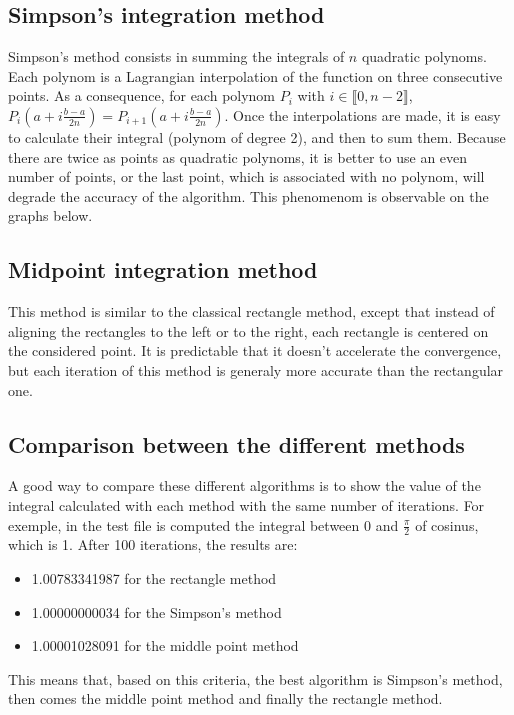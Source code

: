 \documentclass{article}
\begin{document}
\subsection{Simpson's integration method}
Simpson's method consists in summing the integrals of $n$ quadratic polynoms. Each polynom is a Lagrangian interpolation of the function on three consecutive points.
As a consequence, for each polynom $P_i$ with $i \in \llbracket 0, n - 2 \rrbracket$, $P_i(a + i \frac{b-a}{2n}) = P_{i+1}(a + i \frac{b-a}{2n})$. Once the interpolations are made, it is easy to calculate their integral (polynom of degree 2), and then to sum them. Because there are twice as points as quadratic polynoms, it is better to use an even number of points, or the last point, which is associated with no polynom, will degrade the accuracy of the algorithm. This phenomenom is observable on the graphs below.

\subsection{Midpoint integration method}
This method is similar to the classical rectangle method, except that instead of aligning the rectangles to the left or to the right, each rectangle is centered on the considered point. It is predictable that it doesn't accelerate the convergence, but each iteration of this method is generaly more accurate than the rectangular one.

\subsection{Comparison between the different methods}

A good way to compare these different algorithms is to show the value of the integral calculated with each method with the same number of iterations. For exemple, in the test file is computed the integral between $0$ and $\frac{\pi}{2}$ of cosinus, which is 1. After 100 iterations, the results are:
\begin{itemize}
\item 1.00783341987 for the rectangle method
\item 1.00000000034 for the Simpson's method
\item 1.00001028091 for the middle point method
\end{itemize}
This means that, based on this criteria, the best algorithm is Simpson's method, then comes the middle point method and finally the rectangle method.
\end{document}
